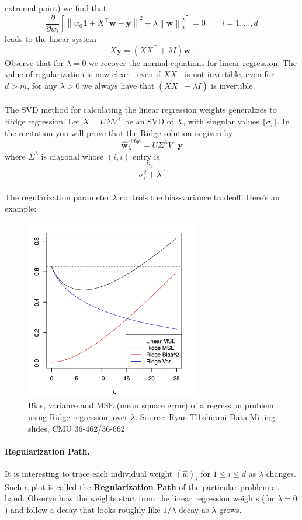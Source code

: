 \documentclass[11pt]{article}
\newcommand{\norm}[1]{\left\| #1\right\|}
\newcommand{\Tr}{\ensuremath{\top}}
\newcommand{\V}[1]{\mathbf{#1}}
\begin{document}
extremal point) we find that 
  \[
    \frac{\partial}
    {\partial w_i}
    \left[
    \norm{ w_0\mathbf{1} + X^\Tr\V{w} -\V{y}  }^2
  +  \lambda \norm{\V{w}}^2_2 \right]=0 \qquad i=1,\ldots,d
  \]
leads to the linear system
\[
  X\V{y} = (XX^\Tr+\lambda I)\V{w} \,.
\]
Observe that for $\lambda=0$ we recover the normal equations for linear
regression. The value of regularization is now clear - even if $XX^\Tr$ is not
invertible, even for $d>m$, for any $\lambda>0$ we always have that
$(XX^\Tr+\lambda I)$ is invertible. 
\\~\\
The SVD method for calculating the linear regression weights generalizes to
Ridge regression. Let $X=U\Sigma V^\Tr$ be an SVD of $X$, with singular values
$\{\sigma_i\}$. In the recitation you will prove that  the Ridge solution is
given by 
\[
  \hat{\V{w}}_\lambda^{ridge} = U \Sigma^\lambda V^\Tr\V{y}
\]
where $\Sigma^\lambda$ is diagonal whose $(i,i)$ entry is 
\[
  \frac{\sigma_i}{\sigma_i^2+\lambda}\,.
\]
~\\
The regularization parameter $\lambda$ controls the bias-variance tradeoff.
Here's an example: 

\begin{figure}[H]
      \centering
      \includegraphics[width=3in]{ridge_bias_variance.jpeg}
      \caption{Bias, variance and MSE (mean square error) of a regression
      problem using Ridge regression, over $\lambda$. Source: Ryan Tibshirani Data Mining slides, CMU 36-462/36-662 }
    \end{figure}

\paragraph{Regularization Path.}
It is interesting to trace each individual weight $(\hat{w})_i$ for $1\leq i\leq
d$ as $\lambda$ changes. Such a plot is called the {\bf Regularization Path} of
the particular problem at hand. Observe how the weights start from the linear
regression weights (for $\lambda=0$) and follow a decay that looks roughly like
$1/\lambda$ decay as $\lambda$
grows. 
\end{document}

